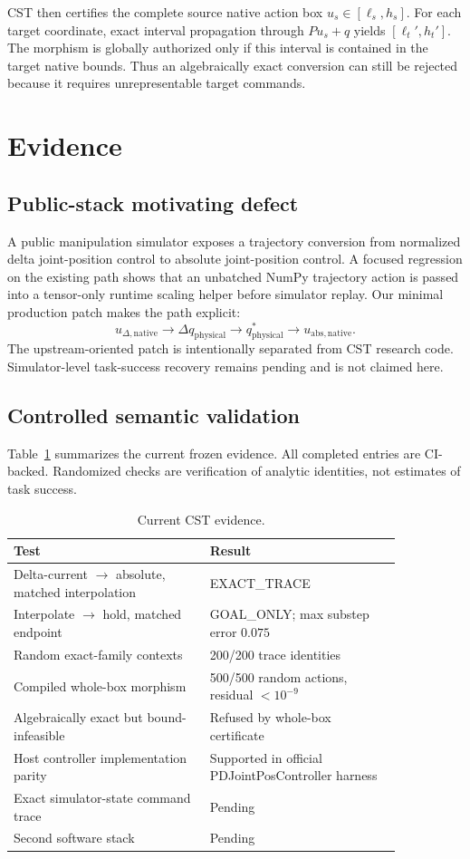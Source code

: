 \documentclass[conference]{IEEEtran}
\begin{document}
CST then certifies the complete source native action box
$u_s\in[\ell_s,h_s]$. For each target coordinate, exact interval propagation
through $Pu_s+q$ yields $[\ell_t',h_t']$. The morphism is globally authorized
only if this interval is contained in the target native bounds. Thus an
algebraically exact conversion can still be rejected because it requires
unrepresentable target commands.

\section{Evidence}
\subsection{Public-stack motivating defect}
A public manipulation simulator exposes a trajectory conversion from normalized
delta joint-position control to absolute joint-position control. A focused
regression on the existing path shows that an unbatched NumPy trajectory action
is passed into a tensor-only runtime scaling helper before simulator replay.
Our minimal production patch makes the path explicit:
\[
u_{\Delta,\mathrm{native}}
\rightarrow \Delta q_{\mathrm{physical}}
\rightarrow q^*_{\mathrm{physical}}
\rightarrow u_{\mathrm{abs,native}}.
\]
The upstream-oriented patch is intentionally separated from CST research code.
Simulator-level task-success recovery remains pending and is not claimed here.

\subsection{Controlled semantic validation}
Table~\ref{tab:evidence} summarizes the current frozen evidence. All completed
entries are CI-backed. Randomized checks are verification of analytic
identities, not estimates of task success.

\begin{table}[t]
\caption{Current CST evidence.}
\label{tab:evidence}
\centering
\small
\begin{tabular}{p{0.43\linewidth}p{0.42\linewidth}}
\toprule
Test & Result \\
\midrule
Delta-current $\rightarrow$ absolute, matched interpolation &
EXACT\_TRACE \\
Interpolate $\rightarrow$ hold, matched endpoint &
GOAL\_ONLY; max substep error $0.075$ \\
Random exact-family contexts &
200/200 trace identities \\
Compiled whole-box morphism &
500/500 random actions, residual $<10^{-9}$ \\
Algebraically exact but bound-infeasible &
Refused by whole-box certificate \\
Host controller implementation parity &
Supported in official PDJointPosController harness \\
Exact simulator-state command trace &
Pending \\
Second software stack &
Pending \\
\bottomrule
\end{tabular}
\end{table}
\end{document}
